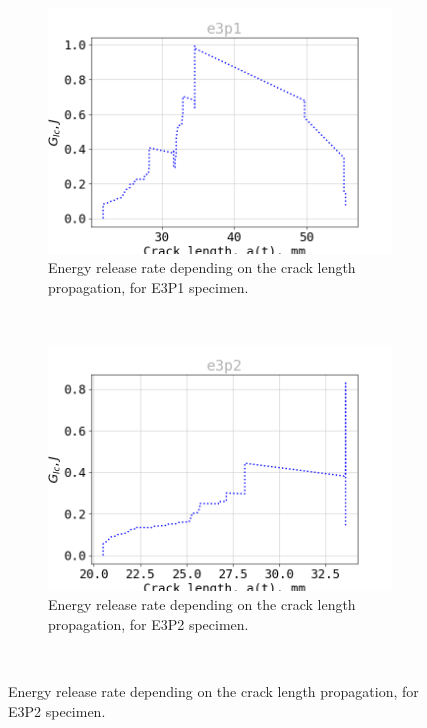 \begin{figure}[H]
\centering
\begin{subfigure}{0.48\linewidth}
	\centering
	\includegraphics[scale=0.3]{Figures/e3p1_G}
	\decoRule
	\caption[Energy release rate E3P1]{Energy release rate depending on the crack length propagation, for E3P1 specimen.}
	\label{fig:E3P1_G}
\end{subfigure}
\hfill\\
\begin{subfigure}{0.48\linewidth}
	\centering
	\includegraphics[scale=0.3]{Figures/e3p2_G}
	\decoRule
	\caption[Energy release rate E3P2]{Energy release rate depending on the crack length propagation, for E3P2 specimen.}
	\label{fig:E3P2_G}
\end{subfigure}
\hfill\\

\end{figure}
